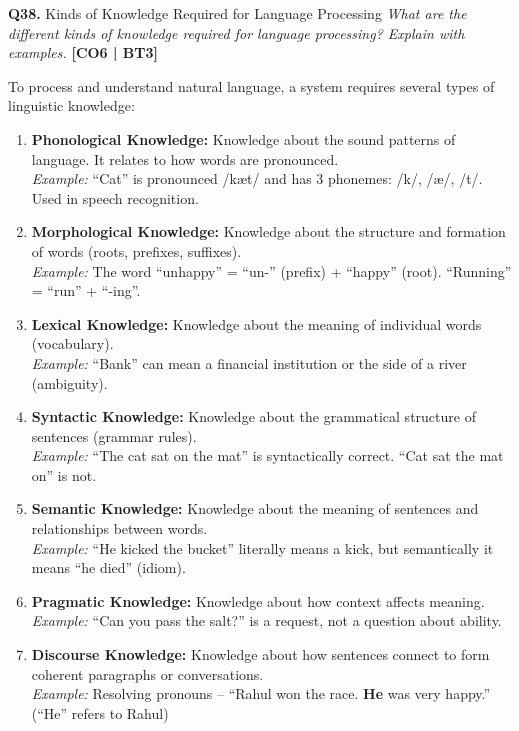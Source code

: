 \documentclass[12pt,a4paper]{article}
\newcommand{\Qno}[1]{\textbf{\color{darkred}Q#1.}}
\newcommand{\term}[1]{\textbf{\color{headingcolor}#1}}
\begin{document}
\vspace{8pt}

\begin{questionbox}{\Qno{38} Kinds of Knowledge Required for Language Processing}
\textit{What are the different kinds of knowledge required for language processing? Explain with examples.} \hfill \textbf{[CO6 | BT3]}
\end{questionbox}

\begin{answerenv}

To process and understand natural language, a system requires several types of linguistic knowledge:

\begin{enumerate}[leftmargin=1.8em, itemsep=6pt]
  \item \term{Phonological Knowledge:} Knowledge about the sound patterns of language. It relates to how words are pronounced.\\
  \textit{Example:} ``Cat'' is pronounced /k\ae t/ and has 3 phonemes: /k/, /\ae/, /t/. Used in speech recognition.

  \item \term{Morphological Knowledge:} Knowledge about the structure and formation of words (roots, prefixes, suffixes).\\
  \textit{Example:} The word ``unhappy'' = ``un-'' (prefix) + ``happy'' (root). ``Running'' = ``run'' + ``-ing''.

  \item \term{Lexical Knowledge:} Knowledge about the meaning of individual words (vocabulary).\\
  \textit{Example:} ``Bank'' can mean a financial institution or the side of a river (ambiguity).

  \item \term{Syntactic Knowledge:} Knowledge about the grammatical structure of sentences (grammar rules).\\
  \textit{Example:} ``The cat sat on the mat'' is syntactically correct. ``Cat sat the mat on'' is not.

  \item \term{Semantic Knowledge:} Knowledge about the meaning of sentences and relationships between words.\\
  \textit{Example:} ``He kicked the bucket'' literally means a kick, but semantically it means ``he died'' (idiom).

  \item \term{Pragmatic Knowledge:} Knowledge about how context affects meaning.\\
  \textit{Example:} ``Can you pass the salt?'' is a request, not a question about ability.

  \item \term{Discourse Knowledge:} Knowledge about how sentences connect to form coherent paragraphs or conversations.\\
  \textit{Example:} Resolving pronouns -- ``Rahul won the race. \textbf{He} was very happy.'' (``He'' refers to Rahul)
\end{enumerate}

\end{answerenv}
\end{document}
